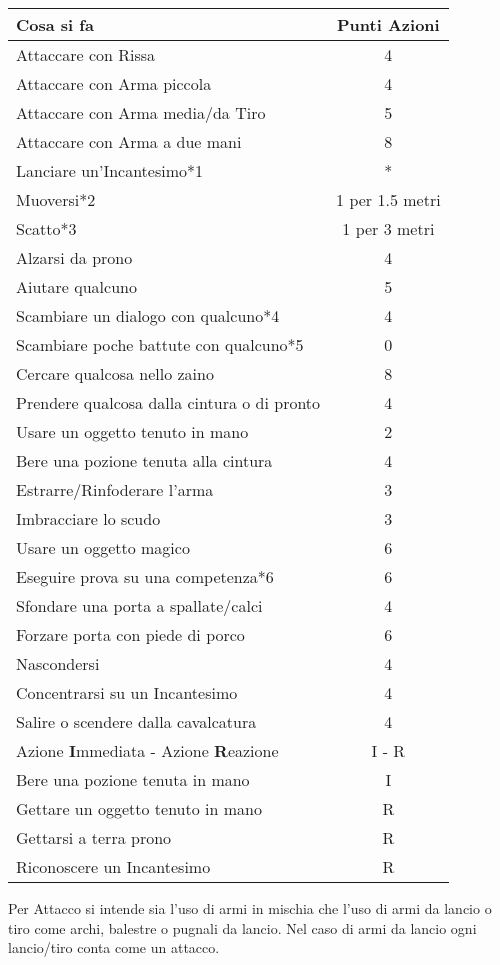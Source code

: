 \documentclass[12pt,a4paper,twoside,openany]{book}
\begin{document}
\begin{tabularx}{0.95\textwidth}{Xc}
\textbf{Cosa si fa}  & \textbf{Punti Azioni}\\
\toprule
Attaccare con Rissa					& 4\\
Attaccare con Arma piccola			& 4\\
Attaccare con Arma media/da Tiro	& 5\\
Attaccare con Arma a due mani		& 8\\
Lanciare un'Incantesimo*1			& *\\
Muoversi*2							& 1 per 1.5 metri\\
Scatto*3							& 1 per 3 metri\\
Alzarsi da prono					& 4\\
Aiutare qualcuno					& 5\\
Scambiare un dialogo con qualcuno*4	& 4\\
{\small Scambiare poche battute con qualcuno*5}& 0\\
Cercare qualcosa nello zaino		& 8\\
Prendere qualcosa dalla cintura o di pronto & 4\\
Usare un oggetto tenuto in mano		& 2\\
Bere una pozione tenuta alla cintura& 4\\
Estrarre/Rinfoderare l'arma			& 3\\
Imbracciare lo scudo				& 3\\
Usare un oggetto magico				& 6\\
Eseguire prova su una competenza*6	& 6\\
Sfondare una porta a spallate/calci	& 4\\
Forzare porta con piede di porco	& 6\\
Nascondersi							& 4\\
Concentrarsi su un Incantesimo		& 4\\
Salire o scendere dalla cavalcatura	& 4\\
Azione \textbf{I}mmediata - Azione \textbf{R}eazione& I - R\\
Bere una pozione tenuta in mano& I\\
Gettare un oggetto tenuto in mano& R\\
Gettarsi a terra prono& R\\
Riconoscere un Incantesimo& R\\
\end{tabularx}

\medskip

Per Attacco si intende sia l'uso di armi in mischia che l'uso di armi da lancio o tiro come archi, balestre o pugnali da lancio. Nel caso di armi da lancio ogni lancio/tiro conta come un attacco.
\end{document}
